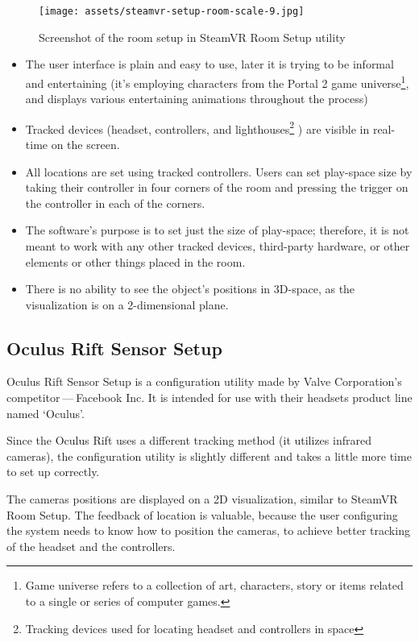\begin{figure}[h]{}
\centering\texttt{[image: assets/steamvr-setup-room-scale-9.jpg]}
\caption{Screenshot of the room setup in SteamVR Room Setup utility}
\end{figure}

\begin{itemize}
\item The user interface is plain and easy to use, later it is trying to be informal
and entertaining (it’s employing characters from the Portal 2 game universe\footnote{Game universe refers to a collection of art, characters, story or items related to a single or series of computer games.},
and displays various entertaining animations throughout the process)
\item Tracked devices (headset, controllers, and lighthouses\footnote{Tracking devices used for locating headset and controllers in space}
) are visible in
real-time on the screen.
\item All locations are set using tracked controllers. Users can set play-space
size by taking their controller in four corners of the room and pressing
the trigger on the controller in each of the corners.
\item The software’s purpose is to set just the size of play-space; therefore, it is not
meant to work with any other tracked devices, third-party hardware, or other elements or
other things placed in the room.
\item There is no ability to see the object’s positions in 3D-space, as the visualization is
on a 2-dimensional plane.
\end{itemize}

\hypertarget{x-oculus-rift-sensor-setup}{\subsection{Oculus Rift Sensor Setup}}
Oculus Rift Sensor Setup is a configuration utility made by Valve Corporation’s
competitor — Facebook Inc. It is intended for use with their headsets
product line named `Oculus'.

Since the Oculus Rift uses a different tracking method (it utilizes infrared cameras),
the configuration utility is slightly different and takes a little more
time to set up correctly.

The cameras positions are displayed on a 2D visualization, similar
to SteamVR Room Setup. The feedback of location is valuable, because the
user configuring the system needs to know how to position the
cameras, to achieve better tracking of the headset and the controllers.

